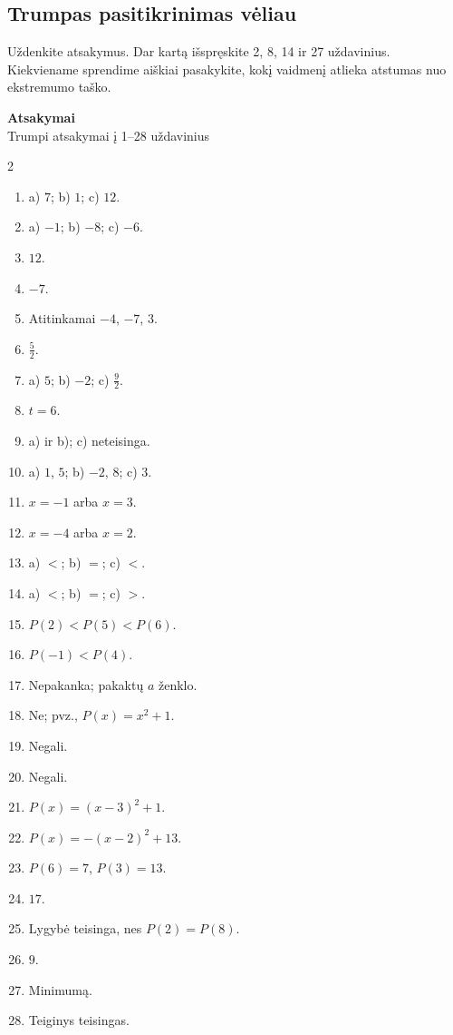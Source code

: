 \documentclass[11pt,a4paper]{scrartcl}
\newcommand{\pagetitle}[2]{\begin{center}{\Large\bfseries #1}\\[3pt]{\small #2}\end{center}\vspace{3mm}}
\begin{document}
\subsection*{Trumpas pasitikrinimas vėliau}
Uždenkite atsakymus. Dar kartą išspręskite 2, 8, 14 ir 27 uždavinius. Kiekviename sprendime aiškiai pasakykite, kokį vaidmenį atlieka atstumas nuo ekstremumo taško.


\newpage\pagetitle{Atsakymai}{Trumpi atsakymai į 1--28 uždavinius}\begin{multicols}{2}\begin{enumerate}
\item a) $7$; b) $1$; c) $12$.
\item a) $-1$; b) $-8$; c) $-6$.
\item $12$.
\item $-7$.
\item Atitinkamai $-4$, $-7$, $3$.
\item $\frac52$.
\item a) $5$; b) $-2$; c) $\frac92$.
\item $t=6$.
\item a) ir b); c) neteisinga.
\item a) $1$, $5$; b) $-2$, $8$; c) $3$.
\item $x=-1$ arba $x=3$.
\item $x=-4$ arba $x=2$.
\item a) $<$; b) $=$; c) $<$.
\item a) $<$; b) $=$; c) $>$.
\item $P(2)<P(5)<P(6)$.
\item $P(-1)<P(4)$.
\item Nepakanka; pakaktų $a$ ženklo.
\item Ne; pvz., $P(x)=x^2+1$.
\item Negali.
\item Negali.
\item $P(x)=(x-3)^2+1$.
\item $P(x)=-(x-2)^2+13$.
\item $P(6)=7$, $P(3)=13$.
\item $17$.
\item Lygybė teisinga, nes $P(2)=P(8)$.
\item $9$.
\item Minimumą.
\item Teiginys teisingas.
\end{enumerate}\end{multicols}
\end{document}
